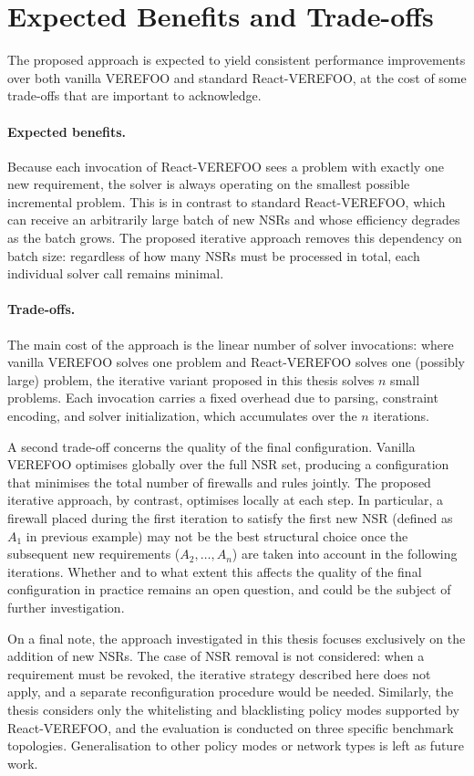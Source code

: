 \section{Expected Benefits and Trade-offs}

The proposed approach is expected to yield consistent performance improvements over both vanilla VEREFOO and standard React-VEREFOO, at the cost of some trade-offs that are important to acknowledge.

\paragraph{Expected benefits.} Because each invocation of React-VEREFOO sees a problem with exactly one new requirement, the solver is always operating on the smallest possible incremental problem. This is in contrast to standard React-VEREFOO, which can receive an arbitrarily large batch of new NSRs and whose efficiency degrades as the batch grows. The proposed iterative approach removes this dependency on batch size: regardless of how many NSRs must be processed in total, each individual solver call remains minimal.

\paragraph{Trade-offs.} The main cost of the approach is the linear number of solver invocations: where vanilla VEREFOO solves one problem and React-VEREFOO solves one (possibly large) problem, the iterative variant proposed in this thesis solves $n$ small problems. Each invocation carries a fixed overhead due to parsing, constraint encoding, and solver initialization, which accumulates over the $n$ iterations.

A second trade-off concerns the quality of the final configuration. Vanilla VEREFOO optimises globally over the full NSR set, producing a configuration that minimises the total number of firewalls and rules jointly. The proposed iterative approach, by contrast, optimises locally at each step. In particular, a firewall placed during the first iteration to satisfy the first new NSR (defined as $A_1$ in previous example) may not be the best structural choice once the subsequent new requirements ($A_2, \ldots, A_n$) are taken into account in the following iterations. Whether and to what extent this affects the quality of the final configuration in practice remains an open question, and could be the subject of further investigation.

On a final note, the approach investigated in this thesis focuses exclusively on the addition of new NSRs. The case of NSR removal is not considered: when a requirement must be revoked, the iterative strategy described here does not apply, and a separate reconfiguration procedure would be needed. Similarly, the thesis considers only the whitelisting and blacklisting policy modes supported by React-VEREFOO, and the evaluation is conducted on three specific benchmark topologies. Generalisation to other policy modes or network types is left as future work.

